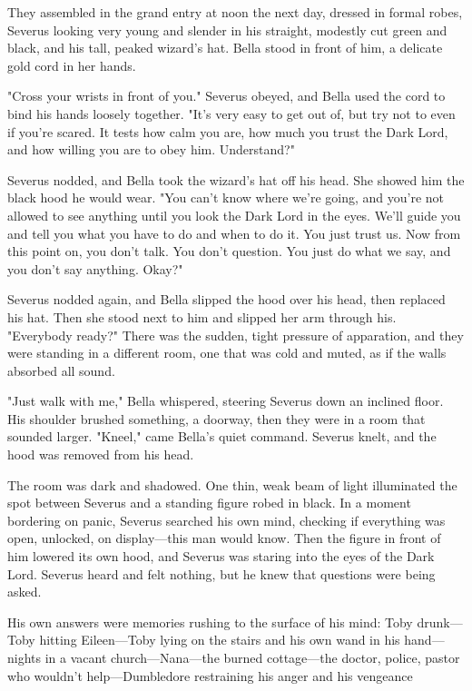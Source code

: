 They assembled in the grand entry at noon the next day, dressed in formal robes, Severus looking very young and slender in his straight, modestly cut green and black, and his tall, peaked wizard's hat. Bella stood in front of him, a delicate gold cord in her hands.

"Cross your wrists in front of you." Severus obeyed, and Bella used the cord to bind his hands loosely together. "It's very easy to get out of, but try not to even if you're scared. It tests how calm you are, how much you trust the Dark Lord, and how willing you are to obey him. Understand?"

Severus nodded, and Bella took the wizard's hat off his head. She showed him the black hood he would wear. "You can't know where we're going, and you're not allowed to see anything until you look the Dark Lord in the eyes. We'll guide you and tell you what you have to do and when to do it. You just trust us. Now from this point on, you don't talk. You don't question. You just do what we say, and you don't say anything. Okay?"

Severus nodded again, and Bella slipped the hood over his head, then replaced his hat. Then she stood next to him and slipped her arm through his. "Everybody ready?" There was the sudden, tight pressure of apparation, and they were standing in a different room, one that was cold and muted, as if the walls absorbed all sound.

"Just walk with me," Bella whispered, steering Severus down an inclined floor. His shoulder brushed something, a doorway, then they were in a room that sounded larger. "Kneel," came Bella's quiet command. Severus knelt, and the hood was removed from his head.

The room was dark and shadowed. One thin, weak beam of light illuminated the spot between Severus and a standing figure robed in black. In a moment bordering on panic, Severus searched his own mind, checking if everything was open, unlocked, on display—this man would know. Then the figure in front of him lowered its own hood, and Severus was staring into the eyes of the Dark Lord. Severus heard and felt nothing, but he knew that questions were being asked.

His own answers were memories rushing to the surface of his mind: Toby drunk—Toby hitting Eileen—Toby lying on the stairs and his own wand in his hand—nights in a vacant church—Nana—the burned cottage—the doctor, police, pastor who wouldn't help—Dumbledore restraining his anger and his vengeance{\el}

